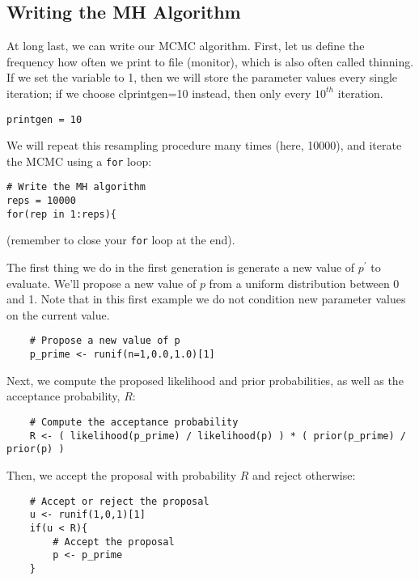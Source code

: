 \subsection{Writing the MH Algorithm}
At long last, we can write our MCMC algorithm.
First, let us define the frequency how often we print to file (\IE monitor), which is also often called thinning.
If we set the variable  to 1, then we will store the parameter values every single iteration; if we choose cl{printgen=10} instead, then only every $10^{th}$ iteration. 
{\tt \begin{snugshade*}
\begin{lstlisting}    
printgen = 10
\end{lstlisting}
\end{snugshade*}}
We will repeat this resampling procedure many times (here, 10000), and iterate the MCMC using a \texttt{for} loop:
{\tt \begin{snugshade*}
\begin{lstlisting}    
# Write the MH algorithm
reps = 10000 
for(rep in 1:reps){
\end{lstlisting}
\end{snugshade*}}
(remember to close your \texttt{for} loop at the end).

The first thing we do in the first generation is generate a new value of $p^\prime$ to evaluate.
We'll propose a new value of $p$ from a uniform distribution between 0 and 1.
Note that in this first example we do not condition new parameter values on the current value.
{\tt \begin{snugshade*}
\begin{lstlisting}    
	# Propose a new value of p
	p_prime <- runif(n=1,0.0,1.0)[1]
\end{lstlisting}
\end{snugshade*}}

Next, we compute the proposed likelihood and prior probabilities, as well as the acceptance probability, $R$:
{\tt \begin{snugshade*}
\begin{lstlisting}    
	# Compute the acceptance probability
	R <- ( likelihood(p_prime) / likelihood(p) ) * ( prior(p_prime) / prior(p) )
\end{lstlisting}
\end{snugshade*}}

Then, we accept the proposal with probability $R$ and reject otherwise:
{\tt \begin{snugshade*}
\begin{lstlisting}    
	# Accept or reject the proposal
	u <- runif(1,0,1)[1]
	if(u < R){
		# Accept the proposal
		p <- p_prime
	}
\end{lstlisting}
\end{snugshade*}}

